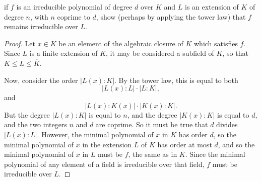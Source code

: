 \documentclass[12pt]{article}
\theoremstyle{definition}
\newenvironment{problem}[2][Problem]{\begin{trivlist}
\item[\hskip \labelsep {\bfseries #1}\hskip \labelsep {\bfseries #2.}]}{\end{trivlist}}
\begin{document}
\begin{problem}{6}
	if $f$ is an irreducible polynomial of degree $d$ over $K$ and $L$ is an extension of $K$ of degree $n$, with $n$ coprime to $d$, show (perhaps by applying the tower law) that $f$ remains irreducible over $L$.
	\begin{proof}
		Let $x \in \overline K$ be an element of the algebraic closure of $K$ which satisfies $f$. Since $L$ is a finite extension of $K$, it may be considered a subfield of $\overline K$, so that $K \leq L \leq \overline K$. 
		\par Now, consider the order $\left \lvert {  L(x) : K } \right \lvert $. By the tower law, this is equal to both
		\[ \left \lvert {  L(x) : L } \right \lvert  \cdot \left \lvert {  L : K } \right \lvert,\]
		and 
		\[\left \lvert {  L(x) : K(x) } \right \lvert  \cdot \left \lvert {  K(x) : K } \right \lvert. \]
		But the degree $\left \lvert { L(x) : K } \right \lvert $ is equal to $n$, and the degree $\left \lvert {  K(x) : K } \right \lvert $ is equal to $ d$, and the two integers $n$ and $d$ are coprime. So it must be true that $d$ divides $\left \lvert { L(x) : L } \right \lvert $. However, the minimal polynomial of $x$ in $K$ has order $d$, so the minimal polynomial of $x$ in the extension $L$ of $K$ has order at most $d$, and so the minimal polynomial of $x$ in $L$ must be $f$, the same as in $K$. Since the minimal polynomial of any element of a field is irreducible over that field, $f$ must be irreducible over $L$.
	\end{proof}
\end{problem}
\end{document}

